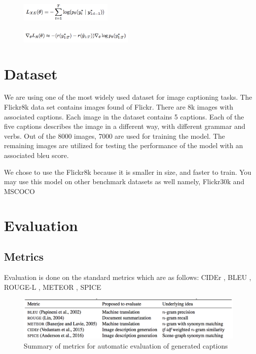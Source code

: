 \documentclass[a4paper]{article}
\begin{document}
\begin{figure}[H]
\centering
\includegraphics[width=0.4\textwidth]{l.png}
\end{figure}

\begin{figure}[H]
\centering
\includegraphics[width=0.5\textwidth]{n.png}
\end{figure}
\cite{DBLP:journals/corr/AndersonHBTJGZ17}

\section{Dataset}
We are using one of the most widely used dataset for image captioning tasks. The Flickr8k data set contains images found of Flickr. There are 8k images with associated captions. Each image in the dataset contains 5 captions. Each of the five captions describes the image in a different way, with different grammar and verbs. Out of the 8000 images, 7000 are used for training the model. The remaining images are utilized for testing the performance of the model with an associated bleu score. \par
We chose to use the Flickr8k because it is smaller in size, and faster to train. You may use this model on other benchmark datasets as well namely, Flickr30k and MSCOCO

\section{Evaluation}
\subsection{Metrics}

Evaluation is done on the standard metrics which are as follows: CIDEr \cite{DBLP:journals/corr/VedantamZP14a}, BLEU \cite{papineni2002bleu},    ROUGE-L \cite{lin2004rouge}, METEOR \cite{denkowski2014meteor}, SPICE \cite{DBLP:journals/corr/AndersonFJG16}

\begin{figure}[H]
\centering
\includegraphics[width=1\textwidth]{metrics.png}
\caption{\label{fig:arch}Summary of metrics for automatic evaluation of generated captions}
\end{figure}
\end{document}
